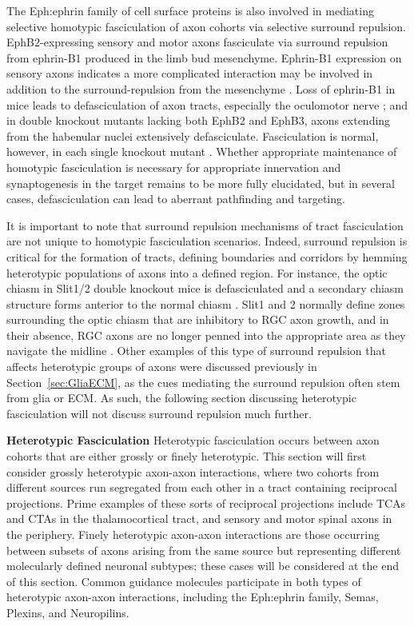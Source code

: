 The Eph:ephrin family of cell surface proteins is also involved in mediating selective homotypic fasciculation of axon cohorts via selective surround repulsion.
EphB2-expressing sensory and motor axons fasciculate via surround repulsion from ephrin-B1 produced in the limb bud mesenchyme.
Ephrin-B1 expression on sensory axons indicates a more complicated interaction may be involved in addition to the surround-repulsion from the mesenchyme \cite{luxey2013eph}.
Loss of ephrin-B1 in mice leads to defasciculation of axon tracts, especially the oculomotor nerve \cite{davy2004ephrin}; and in double knockout mutants lacking both EphB2 and EphB3, axons extending from the habenular nuclei extensively defasciculate.
Fasciculation is normal, however, in each single knockout mutant \cite{orioli1996sek4}.
Whether appropriate maintenance of homotypic fasciculation is necessary for appropriate innervation and synaptogenesis in the target remains to be more fully elucidated, but in several cases, defasciculation can lead to aberrant pathfinding and targeting.

It is important to note that surround repulsion mechanisms of tract fasciculation are not unique to homotypic fasciculation scenarios.
Indeed, surround repulsion is critical for the formation of tracts, defining boundaries and corridors by hemming heterotypic populations of axons into a defined region.
For instance, the optic chiasm in Slit1/2 double knockout mice is defasciculated and a secondary chiasm structure forms anterior to the normal chiasm \cite{plump2002slit1}.
Slit1 and 2 normally define zones surrounding the optic chiasm that are inhibitory to RGC axon growth, and in their absence, RGC axons are no longer penned into the appropriate area as they navigate the midline \cite{plump2002slit1}.
Other examples of this type of surround repulsion that affects heterotypic groups of axons were discussed previously in Section~\ref{sec:GliaECM}, as the cues mediating the surround repulsion often stem from glia or ECM.
As such, the following section discussing heterotypic fasciculation will not discuss surround repulsion much further.

\label{sec:HeterotypicFascic}
\textbf{Heterotypic Fasciculation}\newline
Heterotypic fasciculation occurs between axon cohorts that are either grossly or finely heterotypic.
This section will first consider grossly heterotypic axon-axon interactions, where two cohorts from different sources run segregated from each other in a tract containing reciprocal projections.
Prime examples of these sorts of reciprocal projections include TCAs and CTAs in the thalamocortical tract, and sensory and motor spinal axons in the periphery.
Finely heterotypic axon-axon interactions are those occurring between subsets of axons arising from the same source but representing different molecularly defined neuronal subtypes; these cases will be considered at the end of this section.
Common guidance molecules participate in both types of heterotypic axon-axon interactions, including the Eph:ephrin family, Semas, Plexins, and Neuropilins.

